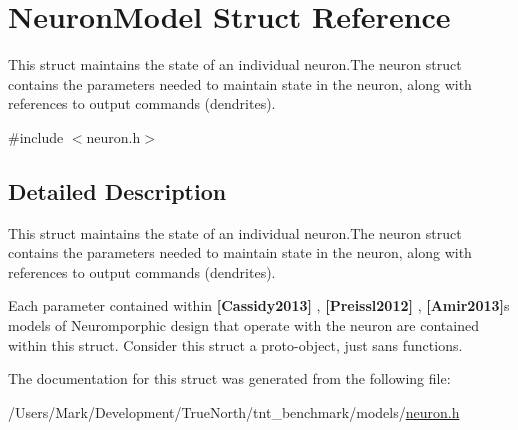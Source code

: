 \hypertarget{struct_neuron_model}{}\section{Neuron\+Model Struct Reference}
\label{struct_neuron_model}


This struct maintains the state of an individual neuron.\+The neuron struct contains the parameters needed to maintain state in the neuron, along with references to output commands (dendrites).  




{\ttfamily \#include $<$neuron.\+h$>$}



\subsection{Detailed Description}
This struct maintains the state of an individual neuron.\+The neuron struct contains the parameters needed to maintain state in the neuron, along with references to output commands (dendrites). 

Each parameter contained within {\bfseries [Cassidy2013]} , {\bfseries [Preissl2012]} , {\bfseries [Amir2013]}\textquotesingle{}s models of Neuromporphic design that operate with the neuron are contained within this struct. Consider this struct a proto-\/object, just sans functions. 

The documentation for this struct was generated from the following file\+:\begin{DoxyCompactItemize}
\item 
/\+Users/\+Mark/\+Development/\+True\+North/tnt\+\_\+benchmark/models/\hyperlink{neuron_8h}{neuron.\+h}\end{DoxyCompactItemize}
